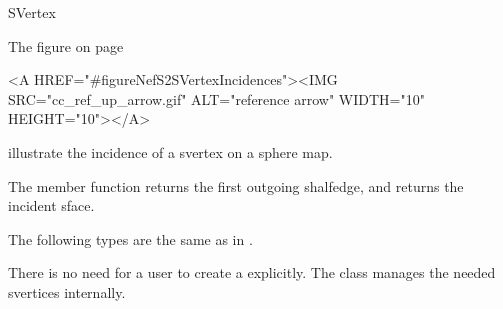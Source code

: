 
\ccRefPageBegin



\begin{ccRefClass}{SVertex}

\ccDefinition
 
The figure on page
\pageref{figureNefS2SVertexIncidences}
\begin{ccHtmlOnly}
  <A HREF="#figureNefS2SVertexIncidences"><IMG 
  SRC="cc_ref_up_arrow.gif" ALT="reference arrow" WIDTH="10" HEIGHT="10"></A>
\end{ccHtmlOnly} illustrate the incidence of a svertex on a sphere map. 

The member function 
 returns the first outgoing shalfedge, and 
returns the incident sface.


\ccTypes
{}
\ccThreeToTwo

The following types are the same as in .



\ccGlue
{}
\ccGlue
{}

\ccCreation
{}

There is no need for a user to create a  explicitly. The
class  manages the needed svertices internally.

\ccOperations



\end{ccRefClass}
